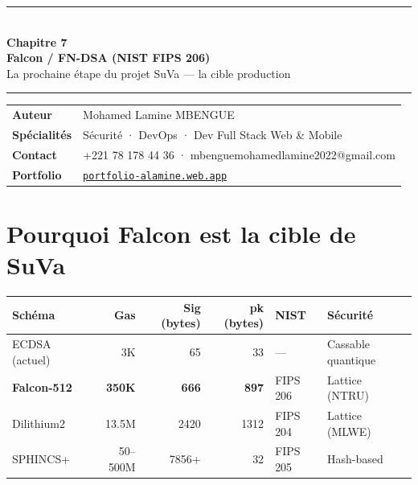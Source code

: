 \documentclass[12pt, a4paper]{article}
\begin{document}
\begin{center}
  {\color{suva_blue}\rule{\linewidth}{2pt}}\\[0.5cm]
  {\Huge\bfseries\color{suva_blue} Chapitre 7}\\[0.3cm]
  {\large\bfseries Falcon / FN-DSA (NIST FIPS 206)}\\[0.2cm]
  {\small\color{gray} La prochaine étape du projet SuVa --- la cible production}\\[0.3cm]
  {\color{suva_blue}\rule{\linewidth}{2pt}}
\end{center}

\vspace{0.3cm}
\begin{tcolorbox}[colback=suva_blue!5, colframe=suva_blue!40,
  left=6pt, right=6pt, top=4pt, bottom=4pt]
\small
\begin{tabular}{ll}
  \textbf{Auteur}      & Mohamed Lamine MBENGUE \\
  \textbf{Spécialités} & Sécurité · DevOps · Dev Full Stack Web \& Mobile \\
  \textbf{Contact}     & +221 78 178 44 36 · mbenguemohamedlamine2022@gmail.com \\
  \textbf{Portfolio}   & \href{https://portfolio-alamine.web.app}{\texttt{portfolio-alamine.web.app}} \\
\end{tabular}
\end{tcolorbox}
\vspace{0.3cm}

\tableofcontents
\newpage

\section{Pourquoi Falcon est la cible de SuVa}

\begin{center}
\begin{tabular}{lrrrll}
\toprule
\textbf{Schéma} & \textbf{Gas} & \textbf{Sig (bytes)} & \textbf{pk (bytes)}
  & \textbf{NIST} & \textbf{Sécurité} \\
\midrule
ECDSA (actuel) & 3K & 65 & 33 & — & Cassable quantique \\
\textbf{Falcon-512} & \textbf{350K} & \textbf{666} & \textbf{897} & FIPS 206 & Lattice (NTRU) \\
Dilithium2 & 13.5M & 2420 & 1312 & FIPS 204 & Lattice (MLWE) \\
SPHINCS+ & 50--500M & 7856+ & 32 & FIPS 205 & Hash-based \\
\bottomrule
\end{tabular}
\end{center}
\end{document}
